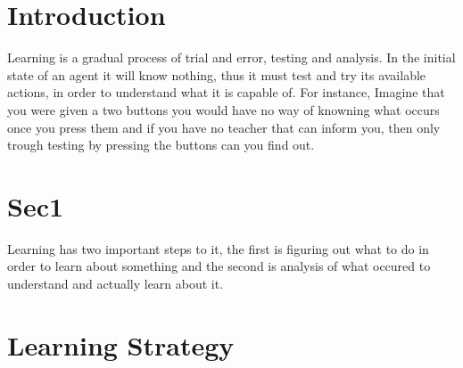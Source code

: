 \documentclass[master.tex]{subfiles}
\begin{document}
    \section*{Introduction}

    Learning is a gradual process of trial and error, testing and analysis.
    In the initial state of an agent it will know nothing, thus it must
    test and try its available actions, in order to understand what it
    is capable of. For instance, Imagine that you were given a two buttons
    you would have no way of knowning what occurs once you press them
    and if you have no teacher that can inform you, then only trough testing
    by pressing the buttons can you find out.




    \section*{Sec1}

    Learning has two important steps to it, the first is figuring out
    what to do in order to learn about something and the second is analysis
    of what occured to understand and actually learn about it.

    \begin{comment}
    Analysing an outcome is about figuring out what occured and what did
    not occur. For instance if one pressed

    In a STRIPS domain, all actions are absolute thus we know that if
    an action changed the state then the action's preconditions was satisfied
    and all predicates added
    \end{comment}



    \section*{Learning Strategy}
\end{document}
